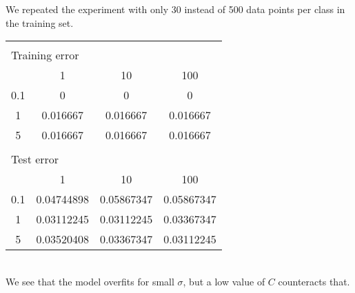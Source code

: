 We repeated the experiment with only 30 instead of 500 data points per class in the training set.

\begin{tabular}{|c|c|c|c|}
\multicolumn{3}{l}{}\\
\multicolumn{3}{l}{Training error}\\
\hline
&1&10&100\\
\hline
0.1&0&0&0\\
\hline
1&0.016667&0.016667&0.016667\\
\hline
5&0.016667&0.016667&0.016667\\
\hline
\multicolumn{3}{l}{}\\
\multicolumn{3}{l}{Test error}\\
\hline
&1&10&100\\
\hline
0.1&0.04744898&0.05867347&0.05867347\\
\hline
1&0.03112245&0.03112245&0.03367347\\
\hline
5&0.03520408&0.03367347&0.03112245\\
\hline
\end{tabular}\\

We see that the model overfits for small $\sigma$, but a low value of $C$ counteracts that.